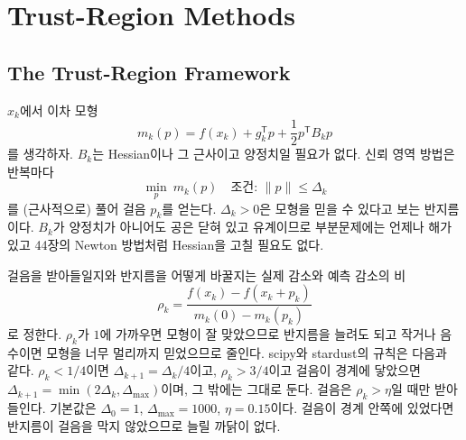 \chapter{Trust-Region Methods}
\label{ch:trust-region}


\section{The Trust-Region Framework}
\label{sec:tr-framework}

$x_k$에서 이차 모형
\[
m_k(p)=f(x_k)+g_k^{\mathsf T}p+\frac12p^{\mathsf T}B_kp
\]
를 생각하자. $B_k$는 Hessian이나 그 근사이고 양정치일 필요가 없다. 신뢰 영역 방법은 반복마다 
\[
\min_p\ m_k(p)\quad\text{조건: }\|p\|\le\Delta_k
\]
를 (근사적으로) 풀어 걸음 $p_k$를 얻는다. $\Delta_k>0$은 모형을 믿을 수 있다고 보는 반지름이다. $B_k$가 양정치가 아니어도 공은 닫혀 있고 유계이므로 부분문제에는 언제나 해가 있고 44장의 Newton 방법처럼 Hessian을 고칠 필요도 없다.

걸음을 받아들일지와 반지름을 어떻게 바꿀지는 실제 감소와 예측 감소의 비
\[
\rho_k=\frac{f(x_k)-f(x_k+p_k)}{m_k(0)-m_k(p_k)}
\]
로 정한다. $\rho_k$가 $1$에 가까우면 모형이 잘 맞았으므로 반지름을 늘려도 되고 작거나 음수이면 모형을 너무 멀리까지 믿었으므로 줄인다. scipy와 stardust의 규칙은 다음과 같다. $\rho_k<1/4$이면 $\Delta_{k+1}=\Delta_k/4$이고, $\rho_k>3/4$이고 걸음이 경계에 닿았으면 $\Delta_{k+1}=\min(2\Delta_k,\Delta_{\max})$이며, 그 밖에는 그대로 둔다. 걸음은 $\rho_k>\eta$일 때만 받아들인다. 기본값은 $\Delta_0=1$, $\Delta_{\max}=1000$, $\eta=0.15$이다. 걸음이 경계 안쪽에 있었다면 반지름이 걸음을 막지 않았으므로 늘릴 까닭이 없다.

